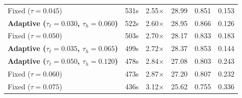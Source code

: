\begin{table}[htbp]
\begin{tabular}{lrrccc}
  Fixed ($\tau=0.045$) & 531s & 2.55$\times$ & 28.99 & 0.851 & 0.153 \\
  \textbf{Adaptive ($\tau_\ell=0.030$, $\tau_h=0.060$)} & 522s & 2.60$\times$ & 28.95 & 0.866 & 0.126 \\
  Fixed ($\tau=0.050$) & 503s & 2.70$\times$ & 28.17 & 0.833 & 0.183 \\
  \textbf{Adaptive ($\tau_\ell=0.035$, $\tau_h=0.065$)} & 499s & 2.72$\times$ & 28.37 & 0.853 & 0.144 \\
  \textbf{Adaptive ($\tau_\ell=0.050$, $\tau_h=0.120$)} & 478s & 2.84$\times$ & 27.08 & 0.803 & 0.243 \\
  Fixed ($\tau=0.060$) & 473s & 2.87$\times$ & 27.20 & 0.807 & 0.232 \\
  Fixed ($\tau=0.075$) & 436s & 3.12$\times$ & 25.62 & 0.755 & 0.336 \\
\bottomrule
\end{tabular}
\end{table}

